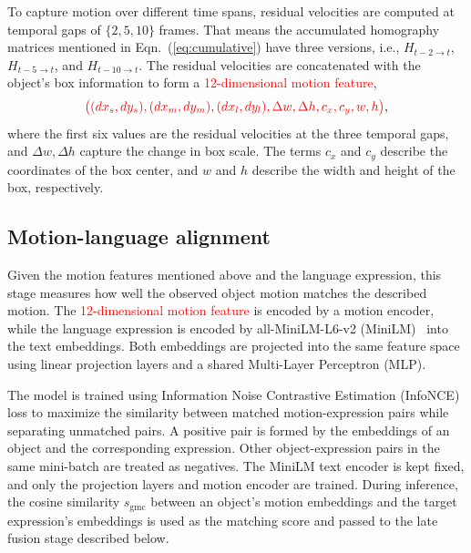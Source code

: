 \documentclass{article}
\begin{document}
To capture motion over different time spans, residual velocities are computed at temporal gaps of $\{2,5,10\}$ frames. That means the accumulated homography matrices mentioned in Eqn.~(\ref{eq:cumulative}) have three versions, i.e., $H_{t-2 \to t}$, $H_{t-5 \to t}$, and $H_{t-10 \to t}$. The residual velocities are concatenated with the object's box information to form a \textcolor{red}{12-dimensional motion feature},
\begin{equation}
  \textcolor{red}{\bigl((dx_s,dy_s),(dx_m,dy_m),(dx_l,dy_l),\Delta w,\Delta h,c_x,c_y,w,h\bigr)},
  \label{eq:descriptor}
\end{equation}
where the first six values are the residual velocities at the three temporal gaps, and $\Delta w, \Delta h$ capture the change in box scale. The terms $c_x$ and $c_y$ describe the coordinates of the box center, and $w$ and $h$ describe the width and height of the box, respectively.

\subsection{Motion-language alignment}
\label{sec:align}
Given the motion features mentioned above and the language expression, this stage measures how well the observed object motion matches the described motion. The \textcolor{red}{12-dimensional motion feature} is encoded by a motion encoder, while the language expression is encoded by all-MiniLM-L6-v2 (MiniLM)~\cite{sbert} into the text embeddings. Both embeddings are projected into the same feature space using linear projection layers and a shared Multi-Layer Perceptron (MLP).

The model is trained using Information Noise Contrastive Estimation (InfoNCE)~\cite{infonce} loss to maximize the similarity between matched motion-expression pairs while separating unmatched pairs. A positive pair is formed by the embeddings of an object and the corresponding expression. Other object-expression pairs in the same mini-batch are treated as negatives. The MiniLM text encoder is kept fixed, and only the projection layers and motion encoder are trained. During inference, the cosine similarity $s_{\mathrm{gmc}}$ between an object's motion embeddings and the target expression's embeddings is used as the matching score and passed to the late fusion stage described below.
\end{document}
